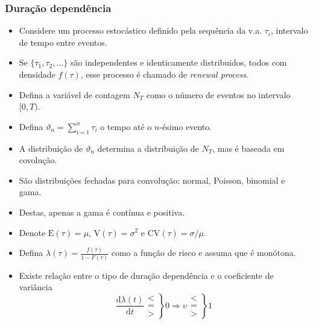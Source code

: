 \documentclass[10pt, aspectratio=169]{beamer}\usepackage[]{graphicx}\usepackage[]{color}
\begin{document}
\begin{frame}[allowframebreaks]
  \frametitle{Duração dependência}
  \begin{itemize}
  \item Considere um processo estocástico definido pela sequência da
    v.a. $\tau_i$, intervalo de tempo entre eventos.
  \item Se $\{\tau_1, \tau_2,\ldots\}$ são independentes e identicamente
    distribuídos, todos com densidade $f(\tau)$, esse processo é chamado
    de \emph{renewal process}.
  \item Defina a variável de contagem $N_T$ como o número de eventos no
    intervalo $[0,T)$.
  \item Defina $\vartheta_n = \sum_{i=1}^{n} \tau_i$ o tempo até o
    $n$-ésimo evento.
  \item A distribuição de $\vartheta_n$ determina a distribuição de
    $N_T$, mas é baseada em covolução.
  \item São distribuições fechadas para convolução: normal, Poisson,
    binomial e gama.
  \item Destas, apenas a gama é contínua e positiva.

    \framebreak

  \item Denote $\text{E}(\tau) = \mu$, $\text{V}(\tau) = \sigma^2$ e
    $\text{CV}(\tau) = \sigma/\mu$.
  \item Defina $\lambda(\tau) = \frac{f(\tau)}{1-F(\tau)}$ como a função
    de risco e assuma que é monótona.
  \item Existe relação entre o tipo de duração dependência e o
    coeficiente de variância
    \begin{equation}
      \frac{\text{d}\lambda(t)}{\text{d}t} \left.\begin{matrix}
          < \\
          = \\
          >
        \end{matrix}\right\} 0 \Rightarrow
      \upsilon \left.\begin{matrix}
          < \\
          = \\
          >
        \end{matrix}\right\} 1
    \end{equation}
  \end{itemize}
\end{frame}
\end{document}
